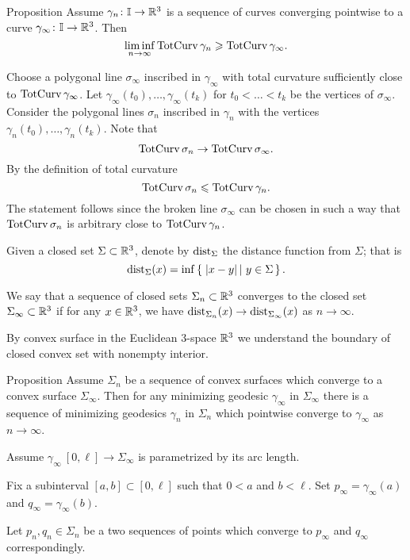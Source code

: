 \documentclass[a4paper,10pt]{amsart}
\begin{document}
\begin{thm}{Proposition}
Assume $\gamma_n\colon\mathbb{I}\to\mathbb{R}^3$ is a sequence of curves  converging pointwise to a curve $\gamma_\infty\colon\mathbb{I}\to\mathbb{R}^3$.
Then 
\[\liminf_{n\to\infty}\mathop{\rm TotCurv}\nolimits\gamma_n\geqslant \mathop{\rm TotCurv}\nolimits\gamma_\infty.\]
\end{thm}


Choose a polygonal line $\sigma_\infty$ inscribed in $\gamma_\infty$ with total curvature sufficiently close to $\mathop{\rm TotCurv}\nolimits\gamma_\infty$.
Let $\gamma_\infty(t_0),\dots,\gamma_\infty(t_k)$
for $t_0<\dots<t_k$
be the vertices of $\sigma_\infty$.
Consider the polygonal lines $\sigma_n$ inscribed in $\gamma_n$ with the vertices 
$\gamma_n(t_0),\dots,\gamma_n(t_k)$.
Note that 
\[\mathop{\rm TotCurv}\nolimits\sigma_n\to\mathop{\rm TotCurv}\nolimits\sigma_\infty.\]
By the definition of total curvature 
\[\mathop{\rm TotCurv}\nolimits\sigma_n\leqslant\mathop{\rm TotCurv}\nolimits\gamma_n.\]
The statement follows since the broken line $\sigma_\infty$ can be chosen in such a way that 
$\mathop{\rm TotCurv}\nolimits\sigma_n$ is arbitrary close to $\mathop{\rm TotCurv}\nolimits\gamma_n$.
\qeds

Given a closed set $\Sigma\subset \mathbb{R}^3$,
denote by $\operatorname{dist}_\Sigma$ the distance function from $\Sigma$;
that is 
\[\dist_\Sigma(x)=\inf\set{|x-y|}{y\in\Sigma}.\]

We say that a sequence of closed sets $\Sigma_n\subset \mathbb{R}^3$
converges to the closed set $\Sigma_\infty\subset \mathbb{R}^3$ 
if for any $x\in\mathbb{R}^3$,
we have
$\operatorname{dist}_{\Sigma_n}(x)\to\operatorname{dist}_{\Sigma_\infty}(x)$ as $n\to\infty$.


By convex surface in the Euclidean 3-space $\mathbb{R}^3$ we understand the boundary of closed convex set with nonempty interior.

\begin{thm}{Proposition}
Assume $\Sigma_n$ be a sequence of convex surfaces which converge to a convex surface $\Sigma_\infty$.
Then for any minimizing geodesic $\gamma_\infty$ in $\Sigma_\infty$ there is a sequence of minimizing geodesics $\gamma_n$ in $\Sigma_n$ which pointwise converge to $\gamma_\infty$ as $n\to \infty$.
\end{thm}

Assume $\gamma_\infty\:[0,\ell]\to\Sigma_\infty$ is parametrized by its arc length.

Fix a subinterval $[a,b]\subset [0,\ell]$
such that $0<a$ and $b<\ell$.
Set $p_\infty=\gamma_\infty(a)$ and $q_\infty=\gamma_\infty(b)$.

Let $p_n,q_n\in\Sigma_n$ be a two sequences of points which converge to $p_\infty$ and $q_\infty$ 
correspondingly.
\end{document}
